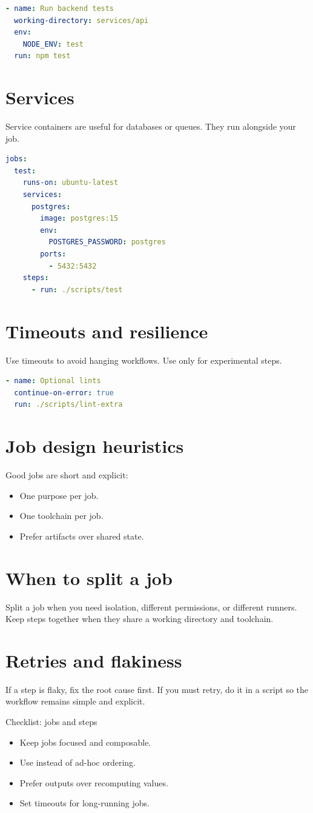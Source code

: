 \begin{lstlisting}[language=YAML]
- name: Run backend tests
  working-directory: services/api
  env:
    NODE_ENV: test
  run: npm test
\end{lstlisting}

\section{Services}
Service containers are useful for databases or queues.
They run alongside your job.

\begin{lstlisting}[language=YAML]
jobs:
  test:
    runs-on: ubuntu-latest
    services:
      postgres:
        image: postgres:15
        env:
          POSTGRES_PASSWORD: postgres
        ports:
          - 5432:5432
    steps:
      - run: ./scripts/test
\end{lstlisting}

\section{Timeouts and resilience}
Use timeouts to avoid hanging workflows.
Use  only for experimental steps.

\begin{lstlisting}[language=YAML]
- name: Optional lints
  continue-on-error: true
  run: ./scripts/lint-extra
\end{lstlisting}

\section{Job design heuristics}
Good jobs are short and explicit:
\begin{itemize}[nosep]
  \item One purpose per job.
  \item One toolchain per job.
  \item Prefer artifacts over shared state.
\end{itemize}

\section{When to split a job}
Split a job when you need isolation, different permissions, or different runners.
Keep steps together when they share a working directory and toolchain.

\section{Retries and flakiness}
If a step is flaky, fix the root cause first.
If you must retry, do it in a script so the workflow remains simple and explicit.

\begin{checklistbox}{Checklist: jobs and steps}
\begin{itemize}[nosep]
  \item Keep jobs focused and composable.
  \item Use  instead of ad-hoc ordering.
  \item Prefer outputs over recomputing values.
  \item Set timeouts for long-running jobs.
\end{itemize}
\end{checklistbox}
